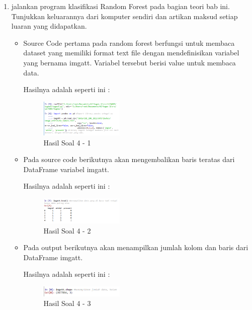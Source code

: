 \begin{enumerate}

	\item jalankan program klasifikasi Random Forest pada bagian teori bab ini. Tunjukkan keluarannya dari komputer sendiri dan artikan maksud setiap luaran yang didapatkan.
	\hfill\break
\begin{itemize}
	\item Source Code pertama pada random forest berfungsi untuk membaca dataset yang memiliki format text file dengan mendefinisikan variabel yang bernama imgatt. Variabel tersebut berisi value untuk membaca data. 
	
	Hasilnya adalah seperti ini :

	\begin{figure}[H]
	\centering
		\includegraphics[width=4cm]{figures/1174009/tugas3/materi/1.PNG}
		\caption{Hasil Soal 4 - 1}
	\end{figure}

	\item Pada source code berikutnya akan mengembalikan baris teratas dari DataFrame variabel imgatt.
	
	Hasilnya adalah seperti ini :

	\begin{figure}[H]
	\centering
		\includegraphics[width=4cm]{figures/1174009/tugas3/materi/2.PNG}
		\caption{Hasil Soal 4 - 2}
	\end{figure}

	\item Pada output berikutnya akan menampilkan jumlah kolom dan baris dari DataFrame imgatt. 
	
	Hasilnya adalah seperti ini :

	\begin{figure}[H]
	\centering
		\includegraphics[width=4cm]{figures/1174009/tugas3/materi/3.PNG}
		\caption{Hasil Soal 4 - 3}
	\end{figure}


\end{itemize}
\end{enumerate}
